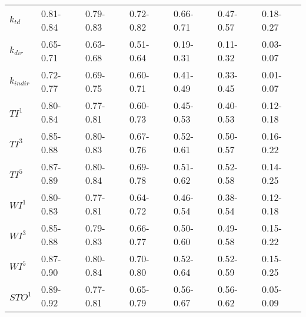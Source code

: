 \begin{table}[ht]
\begin{tabular}{lllllll}
\(\displaystyle k_{td} \) &   {\color[HTML]{EF2A00} 0.81-0.84} & {\color[HTML]{00D768} 0.79-0.83} & {\color[HTML]{0051D7} 0.72-0.82} & {\color[HTML]{6200D7} 0.66-0.71} & {\color{orange} 0.47-0.57} & {\color[HTML]{9B9B9B} 0.18-0.27} \\ 
\(\displaystyle k_{dir} \) &   {\color[HTML]{00D768} 0.65-0.71} & {\color[HTML]{EF2A00} 0.63-0.68} & {\color[HTML]{0051D7} 0.51-0.64} & {\color{orange} 0.19-0.31} & {\color[HTML]{6200D7} 0.11-0.32} & {\color[HTML]{9B9B9B} 0.03-0.07} \\ 
\(\displaystyle k_{indir} \) &   {\color[HTML]{EF2A00} 0.72-0.77} & {\color[HTML]{00D768} 0.69-0.75} & {\color[HTML]{0051D7} 0.60-0.71} & {\color[HTML]{6200D7} 0.41-0.49} & {\color{orange} 0.33-0.45} & {\color[HTML]{9B9B9B} 0.01-0.07} \\ 
\(\displaystyle TI^1 \) &   {\color[HTML]{EF2A00} 0.80-0.84} & {\color[HTML]{00D768} 0.77-0.81} & {\color[HTML]{0051D7} 0.60-0.73} & {\color[HTML]{6200D7} 0.45-0.53} & {\color{orange} 0.40-0.53} & {\color[HTML]{9B9B9B} 0.12-0.18} \\ 
\(\displaystyle TI^3 \) &   {\color[HTML]{EF2A00} 0.85-0.88} & {\color[HTML]{00D768} 0.80-0.83} & {\color[HTML]{0051D7} 0.67-0.76} & {\color{orange} 0.52-0.61} & {\color[HTML]{6200D7} 0.50-0.57} & {\color[HTML]{9B9B9B} 0.16-0.22} \\ 
\(\displaystyle TI^5 \) &   {\color[HTML]{EF2A00} 0.87-0.89} & {\color[HTML]{00D768} 0.80-0.84} & {\color[HTML]{0051D7} 0.69-0.78} & {\color{orange} 0.51-0.62} & {\color[HTML]{6200D7} 0.52-0.58} & {\color[HTML]{9B9B9B} 0.14-0.25} \\ 
\(\displaystyle WI^1 \) &   {\color[HTML]{EF2A00} 0.80-0.83} & {\color[HTML]{00D768} 0.77-0.81} & {\color[HTML]{0051D7} 0.64-0.72} & {\color[HTML]{6200D7} 0.46-0.54} & {\color{orange} 0.38-0.54} & {\color[HTML]{9B9B9B} 0.12-0.18} \\ 
\(\displaystyle WI^3 \) &   {\color[HTML]{EF2A00} 0.85-0.88} & {\color[HTML]{00D768} 0.79-0.83} & {\color[HTML]{0051D7} 0.66-0.77} & {\color{orange} 0.50-0.60} & {\color[HTML]{6200D7} 0.49-0.58} & {\color[HTML]{9B9B9B} 0.15-0.22} \\ 
\(\displaystyle WI^5 \) &   {\color[HTML]{EF2A00} 0.87-0.90} & {\color[HTML]{00D768} 0.80-0.84} & {\color[HTML]{0051D7} 0.70-0.80} & {\color{orange} 0.52-0.64} & {\color[HTML]{6200D7} 0.52-0.59} & {\color[HTML]{9B9B9B} 0.15-0.25} \\ 
\(\displaystyle STO^1 \) &   {\color[HTML]{00D768} 0.89-0.92} & {\color[HTML]{EF2A00} 0.77-0.81} & {\color[HTML]{0051D7} 0.65-0.79} & {\color{orange} 0.56-0.67} & {\color[HTML]{6200D7} 0.56-0.62} & {\color[HTML]{9B9B9B} 0.05-0.09} \\ 

\end{tabular}
\end{table}
